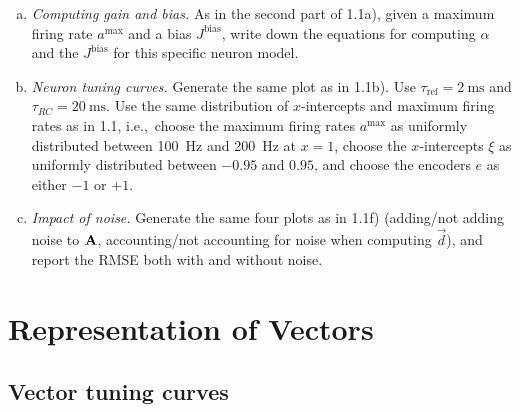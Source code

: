 	\begin{enumerate}[a)]
		\item {} \textit{Computing gain and bias.} As in the second part of 1.1a), given a maximum firing rate $a^\mathrm{max}$ and a bias $J^\mathrm{bias}$, write down the equations for computing $\alpha$ and the $J^\mathrm{bias}$ for this specific neuron model.
		\item {} \textit{Neuron tuning curves.} Generate the same plot as in 1.1b). Use $\tau_\mathrm{ref}=\SI{2}{\milli\second}$ and $\tau_{RC}=\SI{20}{\milli\second}$. Use the same distribution of $x$-intercepts and maximum firing rates as in 1.1, i.e.,~choose the maximum firing rates $a^\mathrm{max}$ as uniformly distributed between \SI{100}{\hertz} and \SI{200}{\hertz} at $x=1$, choose the $x$-intercepts $\xi$ as uniformly distributed between $-0.95$ and $0.95$, and choose the encoders $e$ as either $-1$ or $+1$.
		\item {} \textit{Impact of noise.} Generate the same four plots as in 1.1f) (adding/not adding noise to ${\mathbf{A}}$, accounting/not accounting for noise when computing $\vec d$), and report the RMSE both with and without noise.
	\end{enumerate}
	
	\section{Representation of Vectors}

	\subsection{Vector tuning curves}

